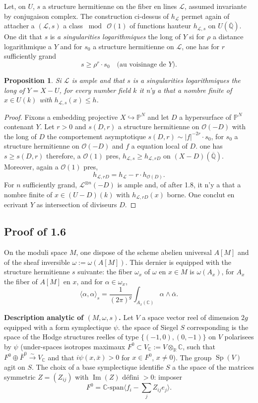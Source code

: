 \documentclass[12pt,a4paper]{article}
\theoremstyle{plain}
\newtheorem{proposition}[theorem]{Proposition}
\theoremstyle{definition}
\theoremstyle{remark}
\DeclareMathOperator{\Sp}{Sp}
\DeclareMathOperator{\Impartie}{Im}
\newcommand{\CC}{\mathbb{C}}
\newcommand{\QQ}{\mathbb{Q}}
\newcommand{\RR}{\mathbb{R}}
\newcommand{\cO}{\mathcal{O}}
\newcommand{\cL}{\mathcal{L}}
\providecommand{\CC}{\mathbb{C}}
\providecommand{\PP}{\mathbb{P}}
\providecommand{\QQ}{\mathbb{Q}}
\providecommand{\RR}{\mathbb{R}}
\providecommand{\cL}{\mathcal{L}}
\providecommand{\cO}{\mathcal{O}}
\begin{document}
Let, on $U$, $s$ a structure hermitienne on the fiber en lines $\cL$, assumed invariante by conjugaison complex. The construction ci-dessus of $h_{\cL}$ permet again of attacher a $(\cL, s)$ a class $\bmod\ \cO(1)$ of functions hauteur $h_{\cL,s}$ on $U(\overline{\QQ})$. One dit that $s$ is \emph{a singularities logarithmiques} the long of $Y$ si for $\rho$ a distance logarithmique a $Y$ and for $s_0$ a structure hermitienne on $\cL$, one has for $r$ sufficiently grand
\[
s \geq \rho^r \cdot s_0 \quad \text{(au voisinage de $Y$)}.
\]

\begin{proposition}
Si $\cL$ is ample and that $s$ is a singularities logarithmiques the long of $Y = X - U$, for every number field $k$ it n'y a that a nombre finite of $x \in U(k)$ with $h_{\cL,s}(x) \leq h$.
\end{proposition}

\begin{proof}
Fixons a embedding projective $X \hookrightarrow \PP^N$ and let $D$ a hypersurface of $\PP^N$ contenant $Y$. Let $r > 0$ and $s(D,r)$ a structure hermitienne on $\cO(-D)$ with the long of $D$ the comportement asymptotique $s(D,r) \sim |f|^{-2r} \cdot s_0$, for $s_0$ a structure hermitienne on $\cO(-D)$ and $f$ a equation local of $D$. one has $s \geq s(D,r)$ therefore, a $\cO(1)$ pres, $h_{\cL,s} \geq h_{\cL,rD}$ on $(X-D)(\overline{\QQ})$. Moreover, again a $\cO(1)$ pres,
\[
h_{\cL,rD} = h_{\cL} - r \cdot h_{\cO(D)}.
\]
For $n$ sufficiently grand, $\cL^{\otimes n}(-D)$ is ample and, of after 1.8, it n'y a that a nombre finite of $x \in (U-D)(k)$ with $h_{\cL,rD}(x)$ borne. One conclut en ecrivant $Y$ as intersection of diviseurs $D$.
\end{proof}

\subsection{Proof of 1.6}

On the moduli space $M$, one dispose of the scheme abelien universal $A[M]$ and of the sheaf inversible $\omega := \omega(A[M])$. This dernier is equipped with the structure hermitienne $s$ suivante: the fiber $\omega_x$ of $\omega$ en $x \in M$ is $\omega(A_x)$, for $A_x$ the fiber of $A[M]$ en $x$, and for $\alpha \in \omega_x$,
\[
\langle \alpha, \alpha \rangle_s = \frac{1}{(2\pi)^g} \int_{A_x(\CC)} \alpha \wedge \bar{\alpha}.
\]

\textbf{Description analytic of $(M, \omega, s)$.} Let $V$ a space vector reel of dimension $2g$ equipped with a form symplectique $\psi$. the space of Siegel $S$ corresponding is the space of the Hodge structures reelles of type $\{(-1,0), (0,-1)\}$ on $V$ polarisees by $\psi$ (under-spaces isotropes maximaux $F^0 \subset V_\CC := V \otimes_\RR \CC$, such that $F^0 \oplus \bar{F}^0 \xrightarrow{\sim} V_\CC$ and that $i\psi(x,\bar{x}) > 0$ for $x \in F^0$, $x \neq 0$). The group $\Sp(V)$ agit on $S$. The choix of a base symplectique identifie $S$ a the space of the matrices symmetric $Z = (Z_{ij})$ with $\Impartie(Z) \text{ défini } > 0$: imposer
\[
F^0 = \CC\text{-span}\langle f_i - \sum_j Z_{ij}e_j \rangle.
\]
\end{document}
